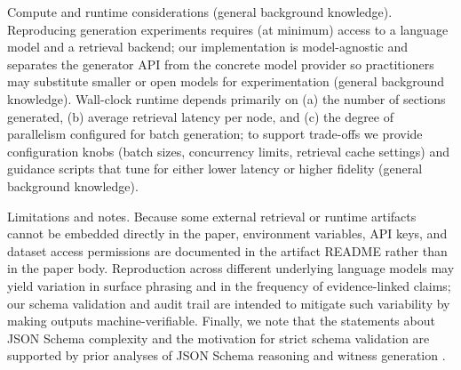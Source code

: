 Compute and runtime considerations (general background knowledge).
Reproducing generation experiments requires (at minimum) access to a language model and a retrieval backend; our implementation is model-agnostic and separates the generator API from the concrete model provider so practitioners may substitute smaller or open models for experimentation (general background knowledge). Wall-clock runtime depends primarily on (a) the number of sections generated, (b) average retrieval latency per node, and (c) the degree of parallelism configured for batch generation; to support trade-offs we provide configuration knobs (batch sizes, concurrency limits, retrieval cache settings) and guidance scripts that tune for either lower latency or higher fidelity (general background knowledge).

Limitations and notes.
Because some external retrieval or runtime artifacts cannot be embedded directly in the paper, environment variables, API keys, and dataset access permissions are documented in the artifact README rather than in the paper body. Reproduction across different underlying language models may yield variation in surface phrasing and in the frequency of evidence-linked claims; our schema validation and audit trail are intended to mitigate such variability by making outputs machine-verifiable. Finally, we note that the statements about JSON Schema complexity and the motivation for strict schema validation are supported by prior analyses of JSON Schema reasoning and witness generation \cite{web_attouche_2022_witness_generation_for_json_schema,web_baazizi_2021_not_elimination_and_witness_generation_for_json_}.